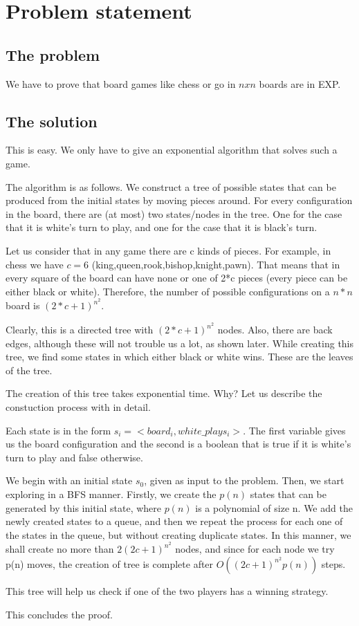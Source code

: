 \section*{Problem statement}
\subsection*{The problem}

We have to prove that board games like chess or go in $nxn$ boards are in EXP.

\subsection*{The solution}

This is easy. We only have to give an exponential algorithm that solves such a 
game. 

The algorithm is as follows. We construct a tree of possible states
that can be produced from the initial states by moving pieces around. 
For every configuration in the board, there are (at most) two states/nodes in the
tree. One for the case that it is white's turn to play, and one for the 
case that it is black's turn. 

Let us consider that in any game there are c kinds of pieces. For example, in chess we have $c=6$ (king,queen,rook,bishop,knight,pawn). That means that in 
every square of the board can have none or one of 2*c pieces (every piece can 
be either black or white).  Therefore, the number of possible 
configurations on a $n*n$ board is $(2*c+1)^{n^2}$. 

Clearly, this is a directed tree with $(2*c+1)^{n^2}$ nodes. Also, there are back edges, although these will not trouble us a lot, as shown later. While 
creating this tree, we find some states in which either black or white 
wins. These are the leaves of the tree. 

The creation of this tree takes exponential time. Why? Let us describe the 
constuction process with in detail.

Each state is in the form $s_i= <board_i, white\_plays_i>$. The first variable gives us the board configuration and 
the second is a boolean that is true if it is white's turn to play and false otherwise. 

We begin with an initial state $s_0$, given as input to the problem. Then, we start exploring in a BFS manner. Firstly, we 
create the $p(n)$ states that can be generated by this initial state, where $p(n)$ is a polynomial of size n. We add the newly
created states to a queue, and then we repeat the process for each one of the states in the queue, but without creating 
duplicate states. In this manner, we shall create no more than $2(2c+1)^{n^2}$ nodes, and since for each node we 
try p(n) moves, the creation of tree is complete after $O((2c+1)^{n^2}p(n))$ steps.

This tree will help us check if one of the two players has a winning strategy.

This concludes the proof.

